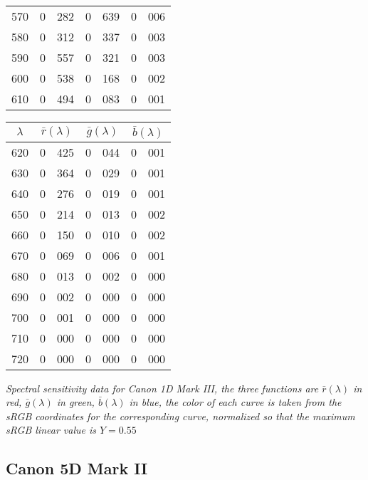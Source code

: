 {{\begin{minipage}{.3\textwidth}
\begin{tabular}{c|r@{.}l | r@{.}l | r@{.}l}
 570 &   0&282 &   0&639 &   0&006 \\
 580 &   0&312 &   0&337 &   0&003 \\
 590 &   0&557 &   0&321 &   0&003 \\
 600 &   0&538 &   0&168 &   0&002 \\
 610 &   0&494 &   0&083 &   0&001 \\
\end{tabular}
\end{minipage}\hskip3mm
\begin{minipage}{.3\textwidth}
\begin{tabular}{c|r@{.}l | r@{.}l | r@{.}l}
$\lambda$ & \multicolumn{2}{c|}{$\bar r(\lambda)$} &  \multicolumn{2}{c|}{$\bar g(\lambda)$} &  \multicolumn{2}{c}{$\bar b(\lambda)$} \\
\hline
 620 &   0&425 &   0&044 &   0&001 \\
 630 &   0&364 &   0&029 &   0&001 \\
 640 &   0&276 &   0&019 &   0&001 \\
 650 &   0&214 &   0&013 &   0&002 \\
 660 &   0&150 &   0&010 &   0&002 \\
 670 &   0&069 &   0&006 &   0&001 \\
 680 &   0&013 &   0&002 &   0&000 \\
 690 &   0&002 &   0&000 &   0&000 \\
 700 &   0&001 &   0&000 &   0&000 \\
 710 &   0&000 &   0&000 &   0&000 \\
 720 &   0&000 &   0&000 &   0&000 \\
\end{tabular}
\end{minipage}

\vskip 1mm
}
\centering
{\footnotesize\it Spectral sensitivity data for Canon 1D Mark III, the three
functions
are $\bar r(\lambda)$ in red, $\bar g(\lambda)$ in green, $\bar b(\lambda)$ in blue,
the color of each curve is taken from the \gls{sRGB} coordinates for the
corresponding
curve, normalized so that the maximum \gls{sRGB} linear value is $Y = 0.55$
}
\label{tab:canon1dmiii}
}

\newpage

\subsection{Canon 5D Mark II}

